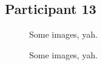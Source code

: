 \lipsum[1]


\clearpage

\subsection{Participant 13}

\begin{figure}[h]
	\caption{Some images, yah.}
\end{figure}

\lipsum[1]

\clearpage

\begin{figure}[h]
	\caption{Some images, yah.}
\end{figure}

